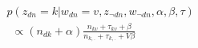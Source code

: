 \documentclass{sig-alternate-05-2015}
\begin{document}
\begin{equation}
\label{eq:LDAgibbs}
\begin{aligned}
&p(z_{dn}=k|w_{dn}=v,z_{\neg{dn}},w_{\neg{dn}},\alpha,\beta,\tau)\\
&\ \ \propto (n_{dk}+\alpha)\frac{n_{kv}+\tau_{kv}+\beta}{n_{k,.}+\tau_{k,.}+V\beta}
\end{aligned}
\end{equation}

\end{document}
